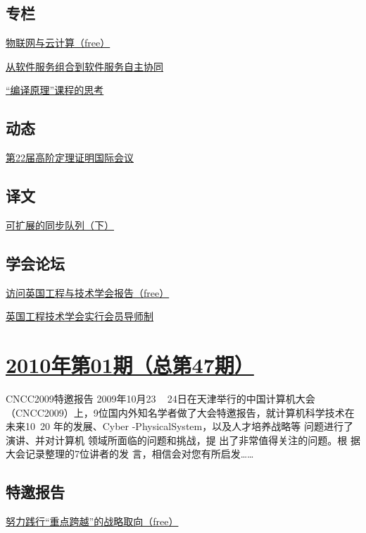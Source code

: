 \documentclass[a4paper]{article}
\begin{document}
\subsection{专栏}
\href{http://history.ccf.org.cn/resources/1190201776262/2010/04/23/2010.2-7.pdf}{物联网与云计算（free）}

\href{http://history.ccf.org.cn/resources/1190201776262/2010/04/23/2010.2-8.pdf}{从软件服务组合到软件服务自主协同}

\href{http://history.ccf.org.cn/resources/1190201776262/2010/04/23/2010.2-9.pdf}{“编译原理”课程的思考}

\subsection{动态}
\href{http://history.ccf.org.cn/resources/1190201776262/2010/04/23/2010.2-10.pdf}{第22届高阶定理证明国际会议}

\subsection{译文}
\href{http://history.ccf.org.cn/resources/1190201776262/2010/04/23/2010.2-11.pdf}{可扩展的同步队列（下）}

\subsection{学会论坛}
\href{http://history.ccf.org.cn/resources/1190201776262/2010/04/23/2010.2-12.pdf}{访问英国工程与技术学会报告（free）}

\href{http://history.ccf.org.cn/resources/1190201776262/2010/05/31/2010.2-13.pdf}{英国工程技术学会实行会员导师制}


\section{\href{http://history.ccf.org.cn/sites/ccf/jsjtbbd.jsp?contentId=2542567629084}{\textbf{2010年第01期（总第47期）}}}
CNCC2009特邀报告 2009年10月23 ~ 24日在天津举行的中国计算机大会
（CNCC2009）上，9位国内外知名学者做了大会特邀报告，就计算机科学技术在未来10~20
年的发展、Cyber -PhysicalSystem，以及人才培养战略等
问题进行了演讲、并对计算机
领域所面临的问题和挑战，提
出了非常值得关注的问题。根
据大会记录整理的7位讲者的发
言，相信会对您有所启发……
\subsection{特邀报告}
\href{http://history.ccf.org.cn/resources/1190201776262/2010/04/22/20101-1.pdf}{努力践行“重点跨越”的战略取向（free）}
\end{document}
